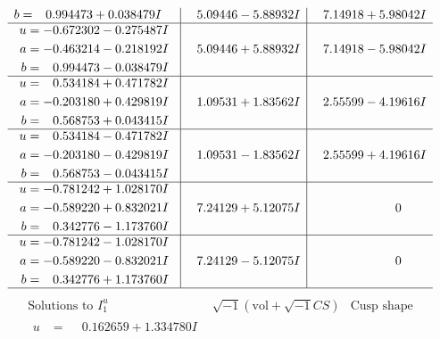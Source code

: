 \documentclass[1p]{elsarticle_modified}
\theoremstyle{definition}
\newcommand{\I}{\sqrt{-1}}
\begin{document}
$$\begin{array}{c|c|c}
\begin{aligned}
b &= \phantom{-}0.994473 + 0.038479 I\end{aligned}
 & \phantom{-}5.09446 - 5.88932 I & \phantom{-}7.14918 + 5.98042 I \\ \hline\begin{aligned}
u &= -0.672302 - 0.275487 I \\
a &= -0.463214 - 0.218192 I \\
b &= \phantom{-}0.994473 - 0.038479 I\end{aligned}
 & \phantom{-}5.09446 + 5.88932 I & \phantom{-}7.14918 - 5.98042 I \\ \hline\begin{aligned}
u &= \phantom{-}0.534184 + 0.471782 I \\
a &= -0.203180 + 0.429819 I \\
b &= \phantom{-}0.568753 + 0.043415 I\end{aligned}
 & \phantom{-}1.09531 + 1.83562 I & \phantom{-}2.55599 - 4.19616 I \\ \hline\begin{aligned}
u &= \phantom{-}0.534184 - 0.471782 I \\
a &= -0.203180 - 0.429819 I \\
b &= \phantom{-}0.568753 - 0.043415 I\end{aligned}
 & \phantom{-}1.09531 - 1.83562 I & \phantom{-}2.55599 + 4.19616 I \\ \hline\begin{aligned}
u &= -0.781242 + 1.028170 I \\
a &= -0.589220 + 0.832021 I \\
b &= \phantom{-}0.342776 - 1.173760 I\end{aligned}
 & \phantom{-}7.24129 + 5.12075 I & \phantom{-0.000000 } 0 \\ \hline\begin{aligned}
u &= -0.781242 - 1.028170 I \\
a &= -0.589220 - 0.832021 I \\
b &= \phantom{-}0.342776 + 1.173760 I\end{aligned}
 & \phantom{-}7.24129 - 5.12075 I & \phantom{-0.000000 } 0\\
 \hline 
 \end{array}$$\newpage$$\begin{array}{c|c|c}  
\text{Solutions to }I^u_{1}& \I (\text{vol} + \sqrt{-1}CS) & \text{Cusp shape}\\
 \hline 
\begin{aligned}
u &= \phantom{-}0.162659 + 1.334780 I \\

\end{aligned}
\end{array}$$
\end{document}

